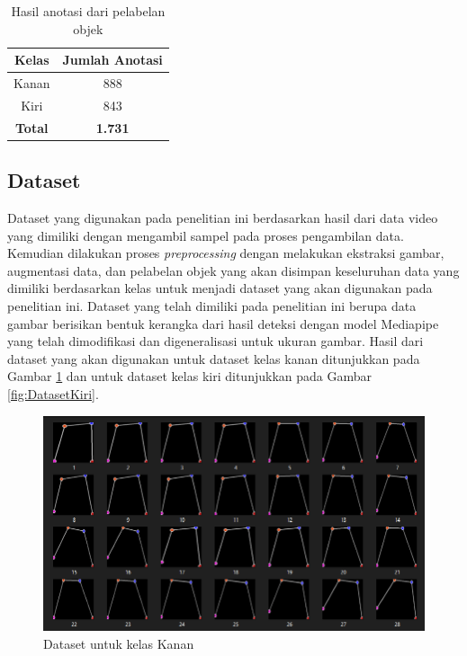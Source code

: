 \begin{longtable}{|c|c|}
  \caption{Hasil anotasi dari pelabelan objek}
  \label{tb:HasilAnotasi}  \\
  \hline
  \rowcolor[HTML]{C0C0C0}
  \textbf{Kelas} & \textbf{Jumlah Anotasi}  \\
  \hline
  Kanan           & 888    \\
  \hline
  Kiri            & 843    \\
  \hline
  \textbf{Total}  & \textbf{1.731}  \\
  \hline
\end{longtable}


\subsection{Dataset}
\label{subsec:Dataset}

Dataset yang digunakan pada penelitian ini berdasarkan hasil dari data video yang dimiliki dengan mengambil sampel pada proses pengambilan data. Kemudian dilakukan proses \emph{preprocessing} dengan melakukan ekstraksi gambar, augmentasi data, dan pelabelan objek yang akan disimpan keseluruhan data yang dimiliki berdasarkan kelas untuk menjadi dataset yang akan digunakan pada penelitian ini. Dataset yang telah dimiliki pada penelitian ini berupa data gambar berisikan bentuk kerangka dari hasil deteksi dengan model Mediapipe yang telah dimodifikasi dan digeneralisasi untuk ukuran gambar. Hasil dari dataset yang akan digunakan untuk dataset kelas kanan ditunjukkan pada Gambar \ref{fig:DatasetKanan} dan untuk dataset kelas kiri ditunjukkan pada Gambar \ref{fig:DatasetKiri}.

\begin{figure}[H]
  \centering
  \includegraphics[scale=0.45]{gambar/folder dataset kanan.png}
  \caption{Dataset untuk kelas Kanan}
  \label{fig:DatasetKanan}
\end{figure}

